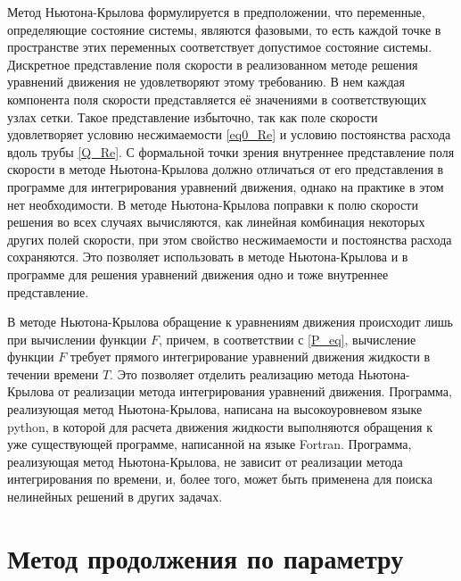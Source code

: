Метод Ньютона-Крылова формулируется в предположении, что переменные, определяющие состояние системы, являются фазовыми, то есть каждой точке в пространстве этих переменных соответствует допустимое состояние системы. Дискретное представление поля скорости в реализованном методе решения уравнений движения не удовлетворяют этому требованию. В нем каждая компонента поля скорости представляется её значениями в соответствующих узлах сетки. Такое представление избыточно, так как поле скорости удовлетворяет условию несжимаемости \eqref{eq0_Re} и условию постоянства расхода вдоль трубы \eqref{Q_Re}. С формальной точки зрения внутреннее представление поля скорости в методе Ньютона-Крылова должно отличаться от его представления в программе для интегрирования уравнений движения, однако на практике в этом нет необходимости. В методе Ньютона-Крылова поправки к полю скорости решения во всех случаях вычисляются, как линейная комбинация некоторых других полей скорости, при этом свойство несжимаемости и постоянства расхода сохраняются. Это позволяет использовать в методе Ньютона-Крылова и в программе для решения уравнений движения одно и тоже внутреннее представление. 

В методе Ньютона-Крылова обращение к уравнениям движения происходит лишь при вычислении функции $F$, причем, в соответствии с \eqref{P_eq}, вычисление функции $F$ требует прямого интегрирование уравнений движения жидкости в течении времени $T$. Это позволяет отделить реализацию метода Ньютона-Крылова от реализации метода интегрирования уравнений движения. Программа, реализующая метод Ньютона-Крылова, написана на высокоуровневом языке python, в которой для расчета движения жидкости выполняются обращения к уже существующей программе, написанной на языке Fortran. Программа, реализующая метод Ньютона-Крылова, не зависит от реализации метода интегрирования по времени, и, более того, может быть применена для поиска нелинейных решений в других задачах. 


\section{Метод продолжения по параметру} \label{contin_sec}

